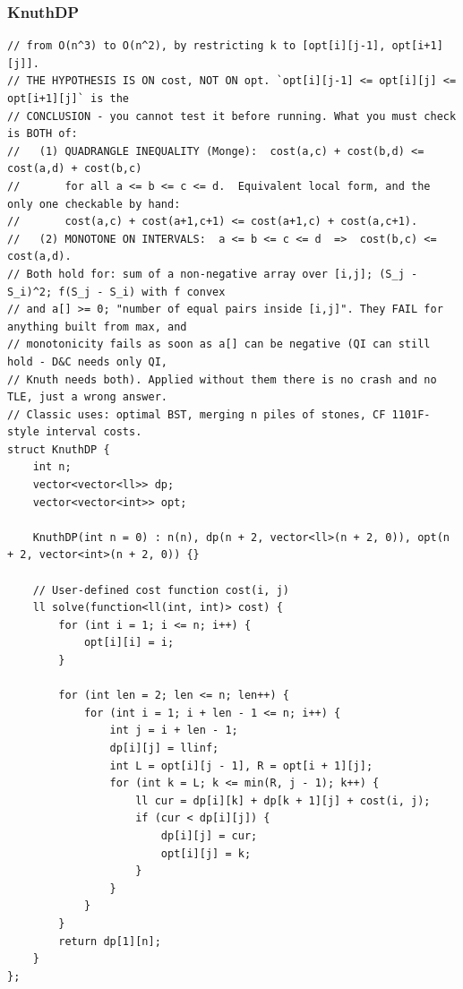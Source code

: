 \documentclass[9pt,a4paper,twocolumn]{extarticle}
\begin{document}
\subsubsection{KnuthDP}
\nopagebreak
\begin{lstlisting}
// from O(n^3) to O(n^2), by restricting k to [opt[i][j-1], opt[i+1][j]].
// THE HYPOTHESIS IS ON cost, NOT ON opt. `opt[i][j-1] <= opt[i][j] <= opt[i+1][j]` is the
// CONCLUSION - you cannot test it before running. What you must check is BOTH of:
//   (1) QUADRANGLE INEQUALITY (Monge):  cost(a,c) + cost(b,d) <= cost(a,d) + cost(b,c)
//       for all a <= b <= c <= d.  Equivalent local form, and the only one checkable by hand:
//       cost(a,c) + cost(a+1,c+1) <= cost(a+1,c) + cost(a,c+1).
//   (2) MONOTONE ON INTERVALS:  a <= b <= c <= d  =>  cost(b,c) <= cost(a,d).
// Both hold for: sum of a non-negative array over [i,j]; (S_j - S_i)^2; f(S_j - S_i) with f convex
// and a[] >= 0; "number of equal pairs inside [i,j]". They FAIL for anything built from max, and
// monotonicity fails as soon as a[] can be negative (QI can still hold - D&C needs only QI,
// Knuth needs both). Applied without them there is no crash and no TLE, just a wrong answer.
// Classic uses: optimal BST, merging n piles of stones, CF 1101F-style interval costs.
struct KnuthDP {
    int n;
    vector<vector<ll>> dp;
    vector<vector<int>> opt;

    KnuthDP(int n = 0) : n(n), dp(n + 2, vector<ll>(n + 2, 0)), opt(n + 2, vector<int>(n + 2, 0)) {}

    // User-defined cost function cost(i, j)
    ll solve(function<ll(int, int)> cost) {
        for (int i = 1; i <= n; i++) {
            opt[i][i] = i;
        }

        for (int len = 2; len <= n; len++) {
            for (int i = 1; i + len - 1 <= n; i++) {
                int j = i + len - 1;
                dp[i][j] = llinf;
                int L = opt[i][j - 1], R = opt[i + 1][j];
                for (int k = L; k <= min(R, j - 1); k++) {
                    ll cur = dp[i][k] + dp[k + 1][j] + cost(i, j);
                    if (cur < dp[i][j]) {
                        dp[i][j] = cur;
                        opt[i][j] = k;
                    }
                }
            }
        }
        return dp[1][n];
    }
};
\end{lstlisting}
\end{document}

